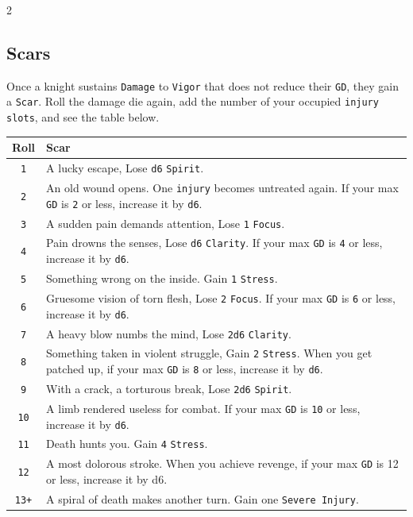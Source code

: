 

\begin{multicols*}{2}

\subsection*{Scars} 

Once a knight sustains \texttt{Damage} to \texttt{Vigor} that does not reduce their \texttt{GD}, they gain a \texttt{Scar}.
Roll the damage die again, add the number of your occupied \texttt{injury slots}, and see the table below. 

\begin{center}
  \label{scars}
    \begin{tabular}{|c|p{6.4cm}|}
        \hline
        \textbf{Roll} & \textbf{Scar} \\
        \hline
        \texttt{1} & A lucky escape, Lose \texttt{d6} \texttt{Spirit}.\\
        \texttt{2} & An old wound opens. One \texttt{injury} becomes untreated again. If your max \texttt{GD} is \texttt{2} or less, increase it by \texttt{d6}. \\
        \texttt{3} & A sudden pain demands attention, Lose \texttt{1} \texttt{Focus}.\\
        \texttt{4} & Pain drowns the senses, Lose \texttt{d6} \texttt{Clarity}. If your max \texttt{GD} is \texttt{4} or less, increase it by \texttt{d6}.\\
        \texttt{5} & Something wrong on the inside. Gain \texttt{1} \texttt{Stress}.\\
        \texttt{6} & Gruesome vision of torn flesh, Lose \texttt{2} \texttt{Focus}. If your max \texttt{GD} is \texttt{6} or less, increase it by \texttt{d6}.\\
        \texttt{7} & A heavy blow numbs the mind, Lose \texttt{2d6} \texttt{Clarity}.\\
        \texttt{8} & Something taken in violent struggle, Gain \texttt{2} \texttt{Stress}. When you get patched up, if your max \texttt{GD} is \texttt{8} or less, increase it by \texttt{d6}.\\
        \texttt{9} & With a crack, a torturous break, Lose \texttt{2d6} \texttt{Spirit}.\\
        \texttt{10} & A limb rendered useless for combat. If your max \texttt{GD} is \texttt{10} or less, increase it by \texttt{d6}. \\
        \texttt{11} & Death hunts you. Gain \texttt{4} \texttt{Stress}. \\
        \texttt{12} & A most dolorous stroke. When you achieve revenge, if your max \texttt{GD} is 12 or less, increase it by d6.\\
        \texttt{13+} & A spiral of death makes another turn. Gain one \texttt{Severe Injury}.\\
        \hline
    \end{tabular}
\end{center}


\end{multicols*}
